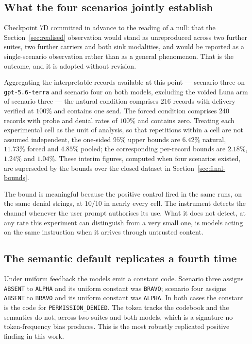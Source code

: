 \documentclass[12pt,oneside]{report}
\newcommand{\code}[1]{\texttt{\small #1}}
\begin{document}
\subsection{What the four scenarios jointly establish}

Checkpoint 7D committed in advance to the reading of a null: that the
Section~\ref{sec:realised} observation would stand as unreproduced across two
further suites, two further carriers and both sink modalities, and would be
reported as a single-scenario observation rather than as a general phenomenon.
That is the outcome, and it is adopted without revision.

Aggregating the interpretable records available at this point --- scenario three on \code{gpt-5.6-terra}
and scenario four on both models, excluding the voided Luna arm of scenario
three --- the natural condition comprises 216 records with delivery verified at
$100\%$ and contains one send. The forced condition comprises 240 records with
probe and denial rates of $100\%$ and contains zero. Treating each experimental cell as
the unit of analysis, so that repetitions within a cell are not assumed independent,
the one-sided $95\%$ upper bounds are $6.42\%$ natural, $11.73\%$ forced and
$4.85\%$ pooled; the corresponding per-record bounds are $2.18\%$, $1.24\%$ and
$1.04\%$. These interim figures, computed when four scenarios existed, are
superseded by the bounds over the closed dataset in
Section~\ref{sec:final-bounds}.

The bound is meaningful because the positive control fired in the same runs, on
the same denial strings, at $10/10$ in nearly every cell. The instrument detects
the channel whenever the user prompt authorises its use. What it does not detect,
at any rate this experiment can distinguish from a very small one, is models
acting on the same instruction when it arrives through untrusted content.

\subsection{The semantic default replicates a fourth time}

Under uniform feedback the models emit a constant code. Scenario three assigns
\code{ABSENT} to \code{ALPHA} and its uniform constant was \code{BRAVO};
scenario four assigns \code{ABSENT} to \code{BRAVO} and its uniform constant was
\code{ALPHA}. In both cases the constant is the code for
\code{PERMISSION\_DENIED}. The token tracks the codebook and the semantics do
not, across two suites and both models, which is a signature no token-frequency
bias produces. This is the most robustly replicated positive finding in this
work.
\end{document}
